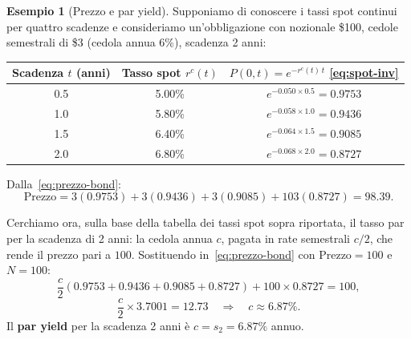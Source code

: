 \documentclass[11pt,a4paper]{article}
\theoremstyle{plain}
\theoremstyle{definition}
\newtheorem{esempio}[teorema]{Esempio}
\theoremstyle{remark}
\newtheorem*{osservazione}{Osservazione}
\begin{document}
\begin{esempio}[Prezzo e par yield]%
\label{ex:hull42}
Supponiamo di conoscere i tassi spot continui per quattro scadenze e consideriamo un'obbligazione con nozionale \$100, cedole semestrali di \$3 (cedola
annua 6\%), scadenza 2 anni:
\begin{center}\small
\renewcommand{\arraystretch}{1.2}
\begin{tabular}{ccc}
\toprule
Scadenza $t$ (anni) & Tasso spot $r^c(t)$ & $P(0,t) = e^{-r^c(t)\,t}$ \eqref{eq:spot-inv} \\
\midrule
0.5 & 5.00\% & $e^{-0.050\times 0.5} = 0.9753$ \\
1.0 & 5.80\% & $e^{-0.058\times 1.0} = 0.9436$ \\
1.5 & 6.40\% & $e^{-0.064\times 1.5} = 0.9085$ \\
2.0 & 6.80\% & $e^{-0.068\times 2.0} = 0.8727$ \\
\bottomrule
\end{tabular}
\end{center}

 Dalla~\eqref{eq:prezzo-bond}:
\[
  \text{Prezzo}
  = 3(0.9753) + 3(0.9436) + 3(0.9085) + 103(0.8727)
  = 98.39.
\]

Cerchiamo ora, sulla base della tabella dei tassi spot sopra riportata, il tasso par per la
scadenza di 2 anni: la cedola annua $c$, pagata in rate semestrali $c/2$, che rende il
prezzo pari a $100$. %
Sostituendo in~\eqref{eq:prezzo-bond} con $\text{Prezzo}=100$ e $N=100$:
\[
  \frac{c}{2}(0.9753 + 0.9436 + 0.9085 + 0.8727) + 100\times 0.8727 = 100,
\]
\[
  \frac{c}{2}\times 3.7001 = 12.73
  \quad\Longrightarrow\quad
  c \approx 6.87\%.
\]
Il \textbf{par yield} per la scadenza 2 anni \`e $c = s_2 = 6.87\%$ annuo.%
\end{esempio}



\end{document}
